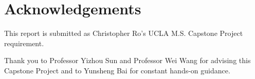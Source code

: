 \section{Acknowledgements}
This report is submitted as Christopher Ro's UCLA M.S. Capstone Project requirement.

Thank you to Professor Yizhou Sun and Professor Wei Wang for advising this Capstone Project and to Yunsheng Bai for constant hands-on guidance.
